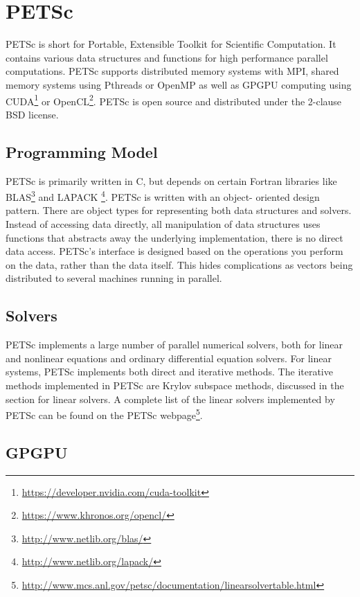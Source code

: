 \section{PETSc}

PETSc is short for Portable, Extensible Toolkit for Scientific Computation. 
It contains various data structures and functions for 
high performance parallel computations. PETSc supports distributed 
memory systems with MPI, shared memory systems using Pthreads or OpenMP as well 
as GPGPU computing using CUDA\footnote{\url{https://developer.nvidia.com/cuda-toolkit}} 
or OpenCL\footnote{\url{https://www.khronos.org/opencl/}}. PETSc is open source and distributed 
under the 2-clause BSD license\cite{petsc-web-page}.

\subsection{Programming Model}

PETSc is primarily written in C, but depends on certain Fortran libraries like 
BLAS\footnote{\url{http://www.netlib.org/blas/}} and LAPACK
\footnote{\url{http://www.netlib.org/lapack/}}. PETSc is written with an object-
oriented design pattern. There are object types for representing both data structures 
and solvers. Instead of accessing data directly, all manipulation of data structures 
uses functions that abstracts away the underlying implementation, there is no direct 
data access. PETSc's interface is designed based on the operations you perform on 
the data, rather than the data itself. This hides complications as vectors being 
distributed to several machines running in parallel.

\subsection{Solvers}

PETSc implements a large number of parallel numerical solvers, both for linear and 
nonlinear equations and ordinary differential equation solvers. For linear systems, 
PETSc implements both direct and iterative methods. The iterative methods implemented 
in PETSc are Krylov subspace methods, discussed in the section for linear solvers.
A complete list of the linear solvers implemented by PETSc can be found on the 
PETSc webpage\footnote{\url{http://www.mcs.anl.gov/petsc/documentation/linearsolvertable.html}}.

\subsection{GPGPU}

